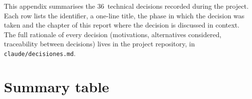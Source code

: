 
\label{ap:decisiones}

This appendix summarises the 36~technical decisions recorded during
the project. Each row lists the identifier, a one-line title, the
phase in which the decision was taken and the chapter of this report
where the decision is discussed in context. The full rationale of
every decision (motivations, alternatives considered, traceability
between decisions) lives in the project repository, in
\texttt{claude/decisiones.md}.

\section{Summary table}
\label{sec:dec-tabla}

